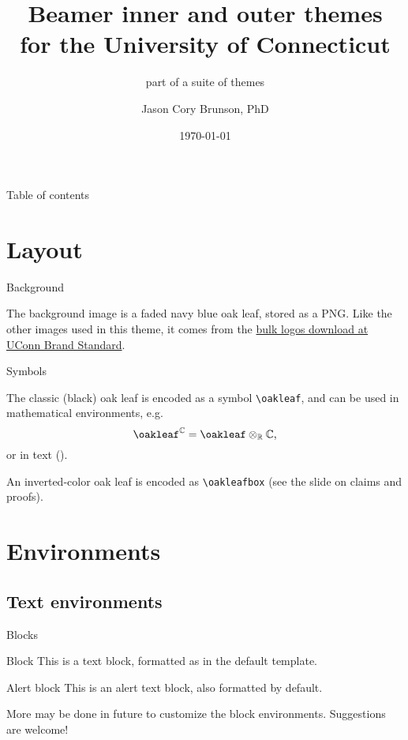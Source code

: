 \documentclass{beamer}
\title[Beamer inner and outer themes for UConn]{Beamer inner and outer themes\\ for the University of Connecticut}
\subtitle{part of a suite of themes}
\author[Cory Brunson]{Jason Cory Brunson, PhD}
\institute[UConn Health]{Center for Quantitative Medicine\\ University of Connecticut School of Medicine}
\date{\today}
\begin{document}
\begin{frame}
\titlepage
\end{frame}


\begin{frame}{Table of contents}
\tableofcontents
\end{frame}


\section{Layout}


\begin{frame}{Background}

The background image is a faded navy blue oak leaf, stored as a PNG. Like the other images used in this theme, it comes from the \href{https://brand.uconn.edu/downloads/logos/}{bulk logos download at UConn Brand Standard}.

\end{frame}


\begin{frame}[fragile]{Symbols}

The classic (black) oak leaf is encoded as a symbol \verb|\oakleaf|, and can be used in mathematical environments, e.g.
\[\oakleaf^{\mathbb{C}}=\oakleaf\otimes_{\mathbb{R}}\mathbb{C}\text,\]
or in text (\oakleaf).

An inverted-color oak leaf is encoded as \verb|\oakleafbox| (see the slide on claims and proofs).

\end{frame}


\section{Environments}


\subsection{Text environments}


\begin{frame}{Blocks}

\begin{block}{Block}
This is a text block, formatted as in the {\ttfamily default} template.
\end{block}

\begin{alertblock}{Alert block}
This is an alert text block, also formatted by default.
\end{alertblock}

More may be done in future to customize the block environments. Suggestions are welcome!

\end{frame}
\end{document}

